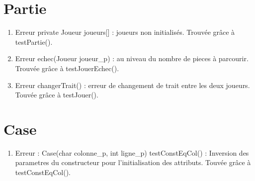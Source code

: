 \section{Partie}
\begin{enumerate}
\item
 Erreur private Joueur joueurs[] : joueurs non initialisés. Trouvée grâce à testPartie().
\item
Erreur echec(Joueur joueur\_p) :  au niveau du nombre de pieces à parcourir. Trouvée grâce à testJouerEchec().
\item
Erreur changerTrait() : erreur de changement de trait entre les deux joueurs. Touvée grâce à testJouer().
\end{enumerate}

\section{Case}
\begin{enumerate}
\item
 Erreur  : Case(char colonne\_p, int ligne\_p) testConstEqCol() : Inversion des parametres du constructeur pour l'initialisation des attributs. Touvée grâce à testConstEqCol().

\end{enumerate}
